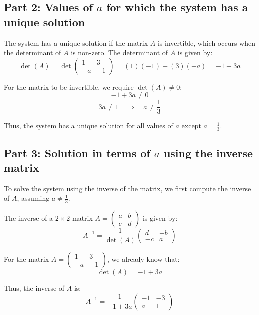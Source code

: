 \documentclass[11pt]{article}
\begin{document}
\newpage

\subsection{Part 2: Values of \( a \) for which the system has a unique solution}

The system has a unique solution if the matrix \( A \) is invertible, which occurs when the determinant of \( A \) is non-zero. The determinant of \( A \) is given by:
\[
\det(A) = \det\begin{pmatrix} 1 & 3 \\ -a & -1 \end{pmatrix} = (1)(-1) - (3)(-a) = -1 + 3a
\]

For the matrix to be invertible, we require \( \det(A) \neq 0 \):
\[
-1 + 3a \neq 0
\]
\[
3a \neq 1 \quad \Rightarrow \quad a \neq \frac{1}{3}
\]

Thus, the system has a unique solution for all values of \( a \) except \( a = \frac{1}{3} \).

\newpage

\subsection{Part 3: Solution in terms of \( a \) using the inverse matrix}

To solve the system using the inverse of the matrix, we first compute the inverse of \( A \), assuming \( a \neq \frac{1}{3} \).

The inverse of a \( 2 \times 2 \) matrix \( A = \begin{pmatrix} a & b \\ c & d \end{pmatrix} \) is given by:
\[
A^{-1} = \frac{1}{\det(A)} \begin{pmatrix} d & -b \\ -c & a \end{pmatrix}
\]

For the matrix \( A = \begin{pmatrix} 1 & 3 \\ -a & -1 \end{pmatrix} \), we already know that:
\[
\det(A) = -1 + 3a
\]

Thus, the inverse of \( A \) is:
\[
A^{-1} = \frac{1}{-1 + 3a} \begin{pmatrix} -1 & -3 \\ a & 1 \end{pmatrix}
\]
\end{document}
